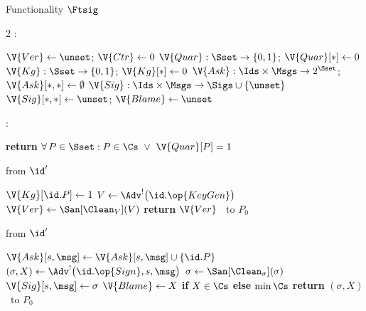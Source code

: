 \begin{interface}[nofloat]{Functionality $\Ftsig$ \\
}

{\scriptsize
\setlength{\columnsep}{1.4em}
\begin{multicols}{2}
:
\begin{algorithmic}[1]
\setcounter{contline}{0}\algcont
\State $\V{Ver} \gets \unset$; \quad $\V{Ctr} \gets 0$
\State $\V{Quar} : \Sset \to \{0,1\}$; \quad $\V{Quar}[*] \gets 0$
\State $\V{Kg} : \Sset \to \{0,1\}$; \quad $\V{Kg}[*] \gets 0$
\State $\V{Ask} : \Ids \times \Msgs \to 2^{\Sset}$; \quad $\V{Ask}[*,*] \gets \emptyset$
\State $\V{Sig} : \Ids \times \Msgs \to \Sigs \cup \{\unset\}$
\State $\V{Sig}[*,*] \gets \unset$; \quad $\V{Blame} \gets \unset$
\algsave
\end{algorithmic}
\vspace{1.4ex}

:
\begin{algorithmic}[1]
\algcont
\State \textbf{return} $\forall\, P \in \Sset : P \in \Cs \ \vee\ \V{Quar}[P] = 1$ \label{ln:tsigcomp}
\algsave
\end{algorithmic}
\vspace{1.4ex}

 \quad from $\id'$
\begin{algorithmic}[1]
\algcont
{}
\State $\V{Kg}[\id.P] \gets 1$
 \label{ln:tsigall}
\State $V \gets \Adv^{!}\bigl(\id.\op{KeyGen}\bigr)$
\State $\V{Ver} \gets \San[\Clean_{V}](V)$ \label{ln:tsigvsan}
\State \textbf{return} $\V{Ver}$ \ to $P_0$
\algsave
\end{algorithmic}
\vspace{1.4ex}

 \quad from $\id'$
\begin{algorithmic}[1]
\algcont
{}
\State $\V{Ask}[s,\msg] \gets \V{Ask}[s,\msg] \cup \{\id.P\}$
 \label{ln:tsigunan}
\State $(\sigma, X) \gets \Adv^{!}\bigl(\id.\op{Sign}, s, \msg\bigr)$
\State $\sigma \gets \San[\Clean_{\sigma}](\sigma)$
\State $\V{Sig}[s,\msg] \gets \sigma$
 \label{ln:tsigblame}
\State $\V{Blame} \gets X$ \textbf{if} $X \in \Cs$ \textbf{else} $\min \Cs$
\EndIf
\State \textbf{return} $(\sigma, X)$ \ to $P_0$
\algsave
\end{algorithmic}
\vspace{1.4ex}


\end{multicols}}
\end{interface}
